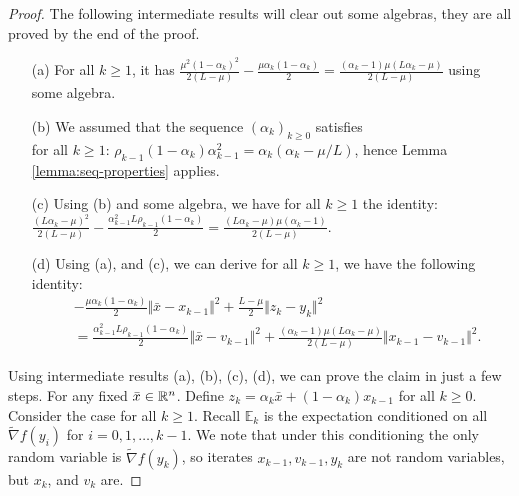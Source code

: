 \documentclass[12pt]{article}
\newcommand{\expect}{\ensuremath{\mathbb E}}
\begin{document}
        \begin{proof}
            The following intermediate results will clear out some algebras, they are all proved by the end of the proof. 
            \begin{enumerate}
                \item [(a)] For all $k \ge 1$, it has $\frac{\mu^2(1 - \alpha_k)^2}{2(L - \mu)} - \frac{\mu\alpha_k(1 - \alpha_k)}{2} = \frac{(\alpha_k - 1)\mu\left(L\alpha_k - \mu\right)}{2\left(L - \mu\right)}$ using some algebra. 
                \item [(b)] We assumed that the sequence $(\alpha_k)_{k \ge 0}$ satisfies\\ for all $k \ge 1$: $\rho_{k - 1}(1 - \alpha_{k})\alpha_{k - 1}^2 = \alpha_{k}(\alpha_{k} - \mu/L)$, hence Lemma \ref{lemma:seq-properties} applies. 
                \item [(c)] Using (b) and some algebra, we have for all $k \ge 1$ the identity: \\
                $\frac{(L\alpha_k - \mu)^2}{2(L - \mu)} - \frac{\alpha_{k - 1}^2 L \rho_{k - 1}(1 - \alpha_k)}{2} = \frac{(L\alpha_k - \mu)\mu(\alpha_k - 1)}{2(L - \mu)}$. 
                \item [(d)] Using (a), and (c), we can derive for all $k\ge 1$, we have the following identity: 
                \begin{align*}
                    & - \frac{\mu\alpha_k(1 - \alpha_k)}{2}\Vert \bar x - x_{k - 1}\Vert^2
                    + \frac{L - \mu}{2}\Vert z_k - y_k\Vert^2
                    \\ &= 
                    \frac{\alpha_{k - 1}^2L \rho_{k - 1}(1 - \alpha_k)}{2}\Vert \bar x - v_{k - 1}\Vert^2
                    + \frac{(\alpha_k - 1)\mu(L\alpha_k - \mu)}{2(L - \mu)}\Vert x_{k - 1} - v_{k - 1}\Vert^2. 
                \end{align*}
            \end{enumerate}
            Using intermediate results (a), (b), (c), (d), we can prove the claim in just a few steps. 
            For any fixed $\bar x \in \mathbb R^n$. 
            Define $z_k = \alpha_k \bar x + (1 - \alpha_k)x_{k - 1}$ for all $k \ge 0$. 
            Consider the case for all $k \ge 1$. 
            Recall $\expect_{k}$ is the expectation conditioned on all $\tilde \nabla f(y_i)$ for $i = 0, 1, \ldots, k - 1$. 
            We note that under this conditioning the only random variable is $\tilde \nabla f(y_k)$, so iterates $x_{k - 1}, v_{k - 1}, y_k$ are not random variables, but $x_k$, and $v_k$ are. 

\end{proof}
\end{document}
